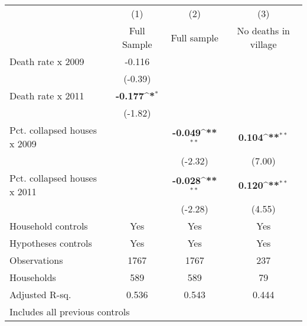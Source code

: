 {
\def\sym#1{\ifmmode^{#1}\else\(^{#1}\)\fi}
\begin{tabular}{l*{3}{c}}
\hline\hline
                    &\multicolumn{1}{c}{(1)}&\multicolumn{1}{c}{(2)}&\multicolumn{1}{c}{(3)}\\
                    &\multicolumn{1}{c}{Full Sample}&\multicolumn{1}{c}{Full sample}&\multicolumn{1}{c}{No deaths in village}\\
\hline
Death rate x 2009   &      -0.116        &                    &                    \\
                    &     (-0.39)        &                    &                    \\
Death rate x 2011   &      \textbf{-0.177\sym{*}} &                    &                    \\
                    &     (-1.82)        &                    &                    \\
[1em]
Pct. collapsed houses x 2009&                    &      \textbf{-0.049\sym{**}}&       \textbf{0.104\sym{**}}\\
                    &                    &     (-2.32)        &      (7.00)        \\
Pct. collapsed houses x 2011&                    &      \textbf{-0.028\sym{**}}&       \textbf{0.120\sym{**}}\\
                    &                    &     (-2.28)        &      (4.55)        \\
[1em]
Household controls  &         Yes        &         Yes        &         Yes        \\
Hypotheses controls &         Yes        &         Yes        &         Yes        \\
\hline
Observations        &        1767        &        1767        &         237        \\
Households          &         589        &         589        &          79        \\
Adjusted R-sq.      &       0.536        &       0.543        &       0.444        \\
\hline\hline
\multicolumn{4}{l}{\footnotesize \tiny{Includes all previous controls}}\\
\end{tabular}
}
